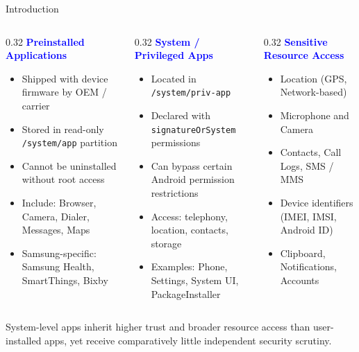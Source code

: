 \documentclass[aspectratio=169]{beamer}
\begin{document}
\begin{frame}{Introduction}
\begin{columns}[T]
    \begin{column}{0.32\textwidth}
        \textbf{\textcolor{blue}{Preinstalled Applications}}
        \begin{itemize}
            \item Shipped with device firmware by OEM / carrier
            \item Stored in read-only \texttt{/system/app} partition
            \item Cannot be uninstalled without root access
            \item Include: Browser, Camera, Dialer, Messages, Maps
            \item Samsung-specific: Samsung Health, SmartThings, Bixby
        \end{itemize}
    \end{column}

    \begin{column}{0.32\textwidth}
        \textbf{\textcolor{blue}{System / Privileged Apps}}
        \begin{itemize}
            \item Located in \texttt{/system/priv-app}
            \item Declared with \texttt{signatureOrSystem} permissions
            \item Can bypass certain Android permission restrictions
            \item Access: telephony, location, contacts, storage
            \item Examples: Phone, Settings, System UI, PackageInstaller
        \end{itemize}
    \end{column}

    \begin{column}{0.32\textwidth}
        \textbf{\textcolor{blue}{Sensitive Resource Access}}
        \begin{itemize}
            \item Location (GPS, Network-based)
            \item Microphone and Camera
            \item Contacts, Call Logs, SMS / MMS
            \item Device identifiers (IMEI, IMSI, Android ID)
            \item Clipboard, Notifications, Accounts
        \end{itemize}
    \end{column}
\end{columns}

\vspace{8pt}
\begin{block}{}
\small
System-level apps inherit higher trust and broader resource access than
user-installed apps, yet receive comparatively little independent security scrutiny.
\end{block}
\end{frame}
\end{document}
